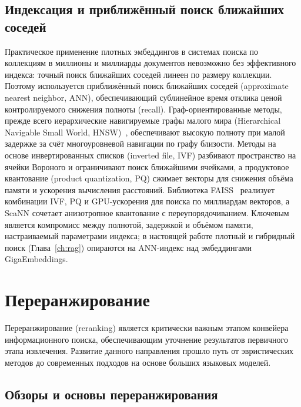 \subsection{Индексация и приближённый поиск ближайших соседей}\label{subsec:ann_indexing}

Практическое применение плотных эмбеддингов в системах поиска по коллекциям в миллионы и миллиарды документов невозможно без эффективного индекса: точный поиск ближайших соседей линеен по размеру коллекции. Поэтому используется приближённый поиск ближайших соседей (approximate nearest neighbor, ANN), обеспечивающий сублинейное время отклика ценой контролируемого снижения полноты (recall). Граф-ориентированные методы, прежде всего иерархические навигируемые графы малого мира (Hierarchical Navigable Small World, HNSW)~\cite{malkov2018hnsw}, обеспечивают высокую полноту при малой задержке за счёт многоуровневой навигации по графу близости. Методы на основе инвертированных списков (inverted file, IVF) разбивают пространство на ячейки Вороного и ограничивают поиск ближайшими ячейками, а продуктовое квантование (product quantization, PQ) сжимает векторы для снижения объёма памяти и ускорения вычисления расстояний. Библиотека FAISS~\cite{johnson2019faiss} реализует комбинации IVF, PQ и GPU-ускорения для поиска по миллиардам векторов, а ScaNN сочетает анизотропное квантование с переупорядочиванием. Ключевым является компромисс между полнотой, задержкой и объёмом памяти, настраиваемый параметрами индекса; в настоящей работе плотный и гибридный поиск (Глава~\ref{ch:rag}) опираются на ANN-индекс над эмбеддингами GigaEmbeddings.

\section{Переранжирование}\label{sec:reranking}

Переранжирование (reranking) является критически важным этапом конвейера информационного поиска, обеспечивающим уточнение результатов первичного этапа извлечения. Развитие данного направления прошло путь от эвристических методов до современных подходов на основе больших языковых моделей.

\subsection{Обзоры и основы переранжирования}\label{subsec:reranking_surveys}

